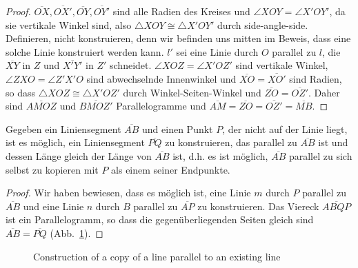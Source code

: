 \begin{proof}
$\overline{OX}, \overline{OX'}, \overline{OY}, \overline{OY'}$ sind alle Radien des Kreises und $\angle XOY = \angle X'OY'$, da sie vertikale Winkel sind, also $\triangle XOY\cong\triangle X'OY'$ durch side-angle-side. Definieren, nicht konstruieren, denn wir befinden uns mitten im Beweis, dass eine solche Linie konstruiert werden kann. $l'$ sei eine Linie durch $O$ parallel zu $l$, die $\overline{XY}$ in $Z$ und $\overline{X'Y'}$ in $Z'$ schneidet. $\angle XOZ=\angle X'OZ'$ sind vertikale Winkel, $\angle ZXO=\angle Z'X'O$ sind abwechselnde Innenwinkel und $\overline{XO}=\overline{XO'}$ sind Radien, so dass $\triangle XOZ\cong\triangle X'OZ'$ durch Winkel-Seiten-Winkel und $\overline{ZO}=\overline{OZ'}$. Daher sind $\overline{AMOZ}$ und $\overline{BMOZ'}$ Parallelogramme und $\overline{AM}=\overline{ZO}=\overline{OZ'}=\overline{MB}$.
\end{proof}

\begin{theorem}
Gegeben ein Liniensegment $\overline{AB}$ und einen Punkt $P$, der nicht auf der Linie liegt, ist es möglich, ein Liniensegment $\overline{PQ}$ zu konstruieren, das parallel zu $\overline{AB}$ ist und dessen Länge gleich der Länge von $\overline{AB}$ ist, d.h. es ist möglich, $\overline{AB}$ parallel zu sich selbst zu kopieren mit $P$ als einem seiner Endpunkte.
\end{theorem}

\begin{proof}
Wir haben bewiesen, dass es möglich ist, eine Linie $m$ durch $P$ parallel zu $\overline{AB}$ und eine Linie $n$ durch $B$ parallel zu $\overline{AP}$ zu konstruieren. Das Viereck $\overline{ABQP}$ ist ein Parallelogramm, so dass die gegenüberliegenden Seiten gleich sind $\overline{AB}=\overline{PQ}$ (Abb.~\ref{f.se-parallel-other4}).
\end{proof}

\begin{figure}[t]
\begin{center}
\end{center}
\caption{Construction of  a copy of a line parallel to an existing line}\label{f.se-parallel-other4}
\end{figure}

